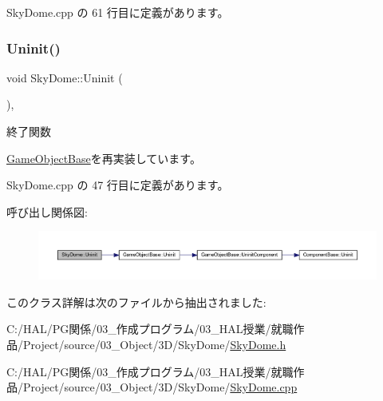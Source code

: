  Sky\+Dome.\+cpp の 61 行目に定義があります。

\mbox{\label{class_sky_dome_a7fc71bfa671cf6e7ab26a194459b0753}} 
\subsubsection{\texorpdfstring{Uninit()}{Uninit()}}
{\footnotesize\ttfamily void Sky\+Dome\+::\+Uninit (\begin{DoxyParamCaption}{ }\end{DoxyParamCaption})\hspace{0.3cm}{\ttfamily [override]}, {\ttfamily [virtual]}}



終了関数 



\mbox{\hyperlink{class_game_object_base_a97e1bc277d7b1c0156d4735de29a022c}{Game\+Object\+Base}}を再実装しています。



 Sky\+Dome.\+cpp の 47 行目に定義があります。

呼び出し関係図\+:\nopagebreak
\begin{figure}[H]
\begin{center}
\leavevmode
\includegraphics[width=350pt]{class_sky_dome_a7fc71bfa671cf6e7ab26a194459b0753_cgraph}
\end{center}
\end{figure}


このクラス詳解は次のファイルから抽出されました\+:\begin{DoxyCompactItemize}
\item 
C\+:/\+H\+A\+L/\+P\+G関係/03\+\_\+作成プログラム/03\+\_\+\+H\+A\+L授業/就職作品/\+Project/source/03\+\_\+\+Object/3\+D/\+Sky\+Dome/\mbox{\hyperlink{_sky_dome_8h}{Sky\+Dome.\+h}}\item 
C\+:/\+H\+A\+L/\+P\+G関係/03\+\_\+作成プログラム/03\+\_\+\+H\+A\+L授業/就職作品/\+Project/source/03\+\_\+\+Object/3\+D/\+Sky\+Dome/\mbox{\hyperlink{_sky_dome_8cpp}{Sky\+Dome.\+cpp}}\end{DoxyCompactItemize}

